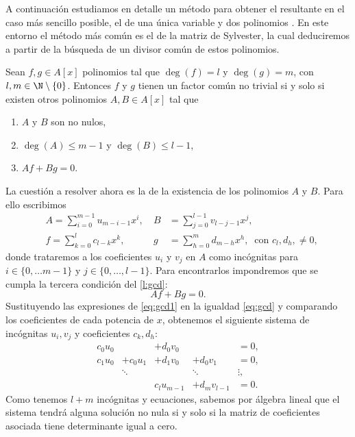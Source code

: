 A continuación estudiamos en detalle un método para obtener el resultante en el caso más sencillo posible, el de una única variable y dos polinomios \cite{ideals_varieties}. En este entorno el método más común es el de la matriz de Sylvester, la cual deduciremos a partir de la búsqueda de un divisor común de estos polinomios.
\begin{lema}\label{l:gcd}
    Sean $f,g\in A[x]$ polinomios tal que $\deg(f) = l$ y $\deg(g) = m$, con $l,m \in \N\setminus \{0\}$. Entonces $f$ y $g$ tienen un factor común no trivial si y solo si existen otros polinomios $A,B \in A[x]$ tal que
    \begin{enumerate}
        \item $A$ y $B$ son no nulos,
        \item $\deg(A)\le m-1$ y $\deg(B)\le l-1$,
        \item $Af+Bg = 0$.
    \end{enumerate}
\end{lema}
La cuestión a resolver ahora es la de la existencia de los polinomios $A$ y $B$. Para ello escribimos
\begin{align}\label{eq:gcd1}
    &A = \sum_{i=0}^{m-1} u_{m-i-1} x^i,   \ &B &= \sum_{j=0}^{l-1} v_{l-j-1} x^j,\\
    &f = \sum_{k=0}^l c_{l-k} x^k,         \ &g &= \sum_{h=0}^m d_{m-h} x^h,\ \text{ con } c_l, d_h,\neq 0,
\end{align}
donde trataremos a los coeficientes $u_i$ y $v_j$ en $A$ como incógnitas para $i\in\{0,\dots m-1\}$ y $j\in \{0,\dots, l-1\}$. Para encontrarlos impondremos que se cumpla la tercera condición del \autoref{l:gcd}:
\begin{equation}\label{eq:gcd}
Af + Bg = 0.    
\end{equation}
Sustituyendo las expresiones de \eqref{eq:gcd1} en la igualdad \eqref{eq:gcd} y comparando los coeficientes de cada potencia de $x$, obtenemos el siguiente sistema de incógnitas $u_i,v_j$ y coeficientes $c_k,d_h$:
\begin{align*}
    c_0u_0  &              &+ d_0v_0       &                        &= 0,\\
    c_1u_0  &+ c_0u_1&+ d_1v_0       &+ d_0v_1               &= 0,\\
            &\ddots        &               & \ddots                &\vdots,\\
            &              &c_lu_{m-1}     &+          d_mv_{l-1}  &=0.
\end{align*}
Como tenemos $l+m$ incógnitas y ecuaciones, sabemos por álgebra lineal que el sistema tendrá alguna solución no nula si y solo si la matriz de coeficientes asociada tiene determinante igual a cero.
